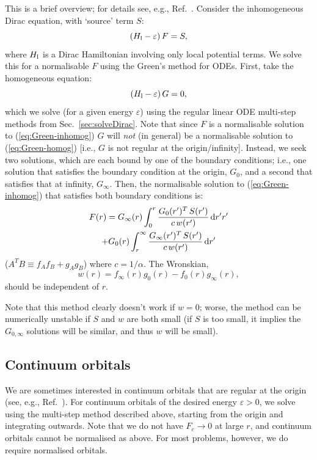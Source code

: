 \documentclass[10pt,twocolumn,a4paper]{article}%
\newcommand{\be}{\begin{equation}}
\newcommand{\ee}{\end{equation}}
\def\d{\ensuremath{{\rm d}}}
\def\en{\ensuremath{\varepsilon}}
\begin{document}
This is a brief overview; for details see, e.g., Ref.~\cite{Arfken2013}.
Consider the inhomogeneous Dirac equation, with `source' term $S$:
\be\label{eq:Green-inhomog}
\left( H_{\rm l}- \en\right)F = S,
\ee
where $H_{\rm l}$ is a Dirac Hamiltonian involving only local potential terms.
We solve this for a normalisable $F$ using the Green's method for ODEs.
First, take the homogeneous equation:
\be\label{eq:Green-homog}
\left( H_{\rm l}- \en\right) G = 0,
\ee
which we solve (for a given energy $\en$) using the regular linear ODE multi-step methods from Sec.~\ref{sec:solveDirac}.
Note that since $F$ is a normalisable solution to (\ref{eq:Green-inhomog}) $G$ will {\em not} (in general) be a normalisable solution to (\ref{eq:Green-homog}) [i.e., $G$ is not regular at the origin/infinity].
Instead, we seek two solutions, which are each bound by one of the boundary conditions; i.e., one solution that satisfies the boundary condition at the origin, $G_0$, and a second that satisfies that at infinity, $G_\infty$.
Then, the normalisable solution to (\ref{eq:Green-inhomog}) that satisfies both boundary conditions is:
\begin{multline}\label{eq:GreensSolution}
F(r) = G_\infty(r) \int_0^r \frac{G_0(r')^T \, S(r')}{c\,w(r')}\,\d r'r'
\\
+  G_0(r) \int_r^\infty \frac{G_\infty(r')^T \, S(r')}{c\,w(r')}\,\d r'
\end{multline}
($A^T B \equiv f_A f_B + g_A g_B$)
where $c=1/\alpha$. 
The Wronskian,
\be\label{eq:Green-Wronskian}
w(r) = f_\infty(r) g_0(r) - f_0(r)g_\infty(r),
\ee
should be independent of $r$.


Note that this method clearly doesn't work if $w=0$; worse, the method can be numerically unstable if $S$ and $w$ are both small (if $S$ is too small, it implies the $G_{0,\infty}$ solutions will be similar, and thus $w$ will be small).



\subsection{Continuum orbitals}

We are sometimes interested in continuum orbitals that are regular at the origin (see, e.g., Ref.~\cite{BetheBook}).
For continuum orbitals of the desired energy $\en>0$, we solve using the multi-step method described above, starting from the origin and integrating outwards.
Note that we do not have $F_c\to0$ at large $r$, and continuum orbitals cannot be normalised as above.
For most problems, however, we do require normalised orbitals.
\end{document}
